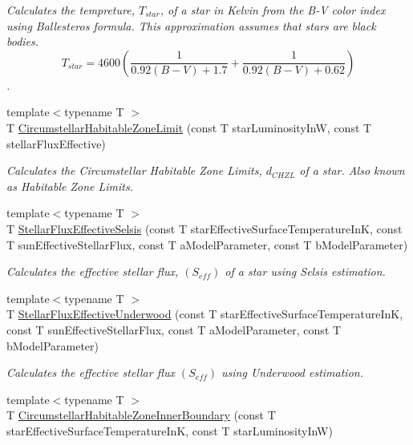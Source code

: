 \begin{DoxyCompactItemize}
\begin{DoxyCompactList}\small\item\em Calculates the tempreture, $T_{star}$, of a star in Kelvin from the B-\/V color index using Ballesteros\textquotesingle{} formula. This approximation assumes that stars are black bodies. \[T_{star}=4600 \left ( \frac{1}{0.92 (B-V)+ 1.7} + \frac{1}{0.92 (B-V) + 0.62} \right )\]. \end{DoxyCompactList}\item 
{\footnotesize template$<$typename T $>$ }\\T \mbox{\hyperlink{group___e_g_x_phys-_circumstellar_habitable_zone_limit_ga809f4c557ce6d2fe566a69c2a8a5d41b}{Circumstellar\+Habitable\+Zone\+Limit}} (const T star\+Luminosity\+InW, const T stellar\+Flux\+Effective)
\begin{DoxyCompactList}\small\item\em Calculates the Circumstellar Habitable Zone Limits, $d_{CHZL}$ of a star. Also known as Habitable Zone Limits. \end{DoxyCompactList}\item 
{\footnotesize template$<$typename T $>$ }\\T \mbox{\hyperlink{group___e_g_x_phys-_circumstellar_habitable_zone_limit_ga0eb1003b4cfcbcafde635cefca5ae5c2}{Stellar\+Flux\+Effective\+Selsis}} (const T star\+Effective\+Surface\+Temperature\+InK, const T sun\+Effective\+Stellar\+Flux, const T a\+Model\+Parameter, const T b\+Model\+Parameter)
\begin{DoxyCompactList}\small\item\em Calculates the effective stellar flux, $(S_{eff})$ of a star using Selsis estimation. \end{DoxyCompactList}\item 
{\footnotesize template$<$typename T $>$ }\\T \mbox{\hyperlink{group___e_g_x_phys-_circumstellar_habitable_zone_limit_gafe02cffcc63c39794feb6f1de5e7a9bb}{Stellar\+Flux\+Effective\+Underwood}} (const T star\+Effective\+Surface\+Temperature\+InK, const T sun\+Effective\+Stellar\+Flux, const T a\+Model\+Parameter, const T b\+Model\+Parameter)
\begin{DoxyCompactList}\small\item\em Calculates the effective stellar flux $(S_{eff})$ using Underwood estimation. \end{DoxyCompactList}\item 
{\footnotesize template$<$typename T $>$ }\\T \mbox{\hyperlink{group___e_g_x_phys-_circumstellar_habitable_zone_limit_gab31a33d0dbd3ecd00537832b5b836d73}{Circumstellar\+Habitable\+Zone\+Inner\+Boundary}} (const T star\+Effective\+Surface\+Temperature\+InK, const T star\+Luminosity\+InW)

\end{DoxyCompactItemize}
